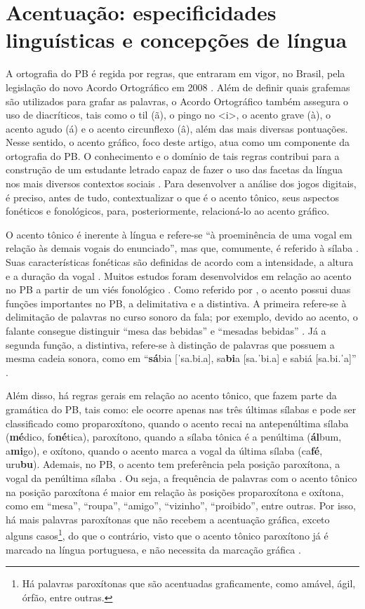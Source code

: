 \documentclass{textolivre}
\begin{document}
\section{Acentuação: especificidades linguísticas e concepções de língua}\label{sec-3}
A ortografia do PB é regida por regras, que entraram em vigor, no Brasil, pela legislação do novo Acordo Ortográfico em 2008 \cite{brasil2008}. Além de definir quais grafemas são utilizados para grafar as palavras, o Acordo Ortográfico também assegura o uso de diacríticos, tais como o til (ã), o pingo no <i>, o acento grave (à), o acento agudo (á) e o acento circunflexo (â), além das mais diversas pontuações. Nesse sentido, o acento gráfico, foco deste artigo, atua como um componente da ortografia do PB. O conhecimento e o domínio de tais regras contribui para a construção de um estudante letrado capaz de fazer o uso das facetas da língua nos mais diversos contextos sociais \cite{soares2004, soares2018}. Para desenvolver a análise dos jogos digitais, é preciso, antes de tudo, contextualizar o que é o acento tônico, seus aspectos fonéticos e fonológicos, para, posteriormente, relacioná-lo ao acento gráfico.

O acento tônico é inerente à língua e refere-se “à proeminência de uma vogal em relação às demais vogais do enunciado”, mas que, comumente, é referido à sílaba \cite[p. 44]{cristofaro2017}. Suas características fonéticas são definidas de acordo com a intensidade, a altura e a duração da vogal \cite{cantoni2013, cristofaro2017}. Muitos estudos foram desenvolvidos em relação ao acento no PB a partir de um viés fonológico \cite{collischonn2005, cantoni2013}. Como referido por \textcite{camara1970}, o acento possui duas funções importantes no PB, a delimitativa e a distintiva. A primeira refere-se à delimitação de palavras no curso sonoro da fala; por exemplo, devido ao acento, o falante consegue distinguir  “mesa das bebidas” e “mesadas bebidas” \cite[p. 17]{ferreira2007}. Já a segunda função, a distintiva, refere-se à distinção de palavras que possuem a mesma cadeia sonora, como em “\textbf{sá}bia [ˈsa.bi.a], sa\textbf{bi}a [sa.ˈbi.a] e sabiá [sa.bi.ˈa]” \cite{camara1970}.

Além disso, há regras gerais em relação ao acento tônico, que fazem parte da gramática do PB, tais como: ele ocorre apenas nas três últimas sílabas e pode ser classificado como proparoxítono, quando o acento recai na antepenúltima sílaba (\textbf{mé}dico, fo\textbf{né}tica), paroxítono, quando a sílaba tônica é a penúltima (\textbf{ál}bum, a\textbf{mi}go), e oxítono, quando o acento marca a vogal da última sílaba (ca\textbf{fé}, uru\textbf{bu}). Ademais, no PB, o acento tem preferência pela posição paroxítona, a vogal da penúltima sílaba \cite{collischonn2005}. Ou seja, a frequência de palavras com o acento tônico na posição paroxítona é maior em relação às posições proparoxítona e oxítona, como em “mesa”, “roupa”, “amigo”, “vizinho”, “proibido”, entre outras. Por isso, há mais palavras paroxítonas que não recebem a acentuação gráfica, exceto alguns casos\footnote{Há palavras paroxítonas que são acentuadas graficamente, como amável, ágil, órfão, entre outras.}, do que o contrário, visto que o acento tônico paroxítono já é marcado na língua portuguesa, e não necessita da marcação gráfica \cite{cantoni2013}.
\end{document}
